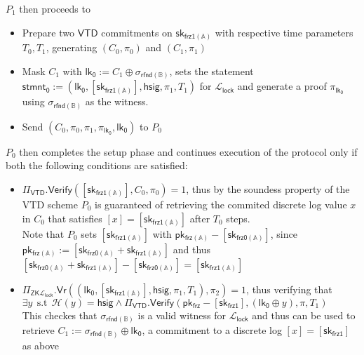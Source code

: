 \documentclass{article}      	%
\begin{document}
$P_1$ then proceeds to
\begin{itemize}
\item Prepare two $\mathsf{VTD}$ commitments on $\mathsf{sk_{frz1(\mathbb{A})}}$ with respective time parameters $T_0, T_1$, generating $(C_0, \pi_0)$ and $(C_1, \pi_1)$
\item Mask $C_1$ with  $\mathsf{lk_0} := C_1 \oplus \sigma_{\mathsf{rfnd(\mathbb{B})}}$, sets the statement $\mathsf{stmnt_0} := (\mathsf{lk_0}, {[\mathsf{sk_{frz1(\mathbb{A})}}]}, \mathsf{hsig}, \pi_1, T_1)$ for $\mathcal{L}_{\mathsf{lock}}$ and generate a proof $\pi_{\mathsf{lk_0}}$ using $\sigma_{\mathsf{rfnd(\mathbb{B})}}$ as the witness.
\item Send $(C_0, \pi_0, \pi_1, \pi_{\mathsf{lk_0}}, \mathsf{lk_0})$ to $P_0$ 
\end{itemize}
\vspace{0.1cm}

$P_0$ then completes the setup phase and continues execution of the protocol only if both the following conditions are satisfied: 
\begin{itemize}
\item $\Pi_{\mathsf{VTD}}.\mathsf{Verify}([\mathsf{sk_{frz1(\mathbb{A})}}], C_0, \pi_0) = 1$, thus by the soundess property of the VTD scheme $P_0$ is guaranteed of retrieving the commited discrete log value $x$ in $C_0$ that satisfies $[x] = [\mathsf{sk_{frz1(\mathbb{A})}}]$ after $T_0$ steps. \\
Note that $P_0$ sets ${[\mathsf{sk_{frz1(\mathbb{A})}}]}$ with $\mathsf{pk_{frz(\mathbb{A})}} - [\mathsf{sk_{frz0(\mathbb{A})}}]$, since $\mathsf{pk_{frz(\mathbb{A})}} := [\mathsf{sk_{frz0(\mathbb{A})}} + \mathsf{sk_{frz1(\mathbb{A})}}]$ and thus $[\mathsf{sk_{frz0(\mathbb{A})}} + \mathsf{sk_{frz1(\mathbb{A})}}] - [\mathsf{sk_{frz0(\mathbb{A})}}] = [\mathsf{sk_{frz1(\mathbb{A})}}]$
\item $\Pi_{\mathsf{ZK}\mathcal{L}_{\mathsf{lock}}}.\mathsf{Vr}((\mathsf{lk_0}, {[\mathsf{sk_{frz1(\mathbb{A})}}]}, \mathsf{hsig}, \pi_1, T_1), \pi_2) = 1$, thus verifying that 
    $\exists y \:\: \text{s.t} \:\: \mathcal{H}(y) = \mathsf{hsig} \land \Pi_\mathsf{VTD}.\mathsf{Verify}(\mathsf{pk_{frz}} - [\mathsf{sk_{frz1}}], (\mathsf{lk_0} \oplus y), \pi, T_1)$ \\
    This checkes that $\sigma_\mathsf{rfnd(\mathbb{B})}$ is a valid witness for $\mathcal{L}_{\mathsf{lock}}$ and thus can be used to retrieve $C_1 := \sigma_\mathsf{rfnd(\mathbb{B})} \oplus \mathsf{lk_0}$, a commitment to a discrete log $[x] = [\mathsf{sk_{frz1}}]$ as above
\end{itemize}
\end{document}
